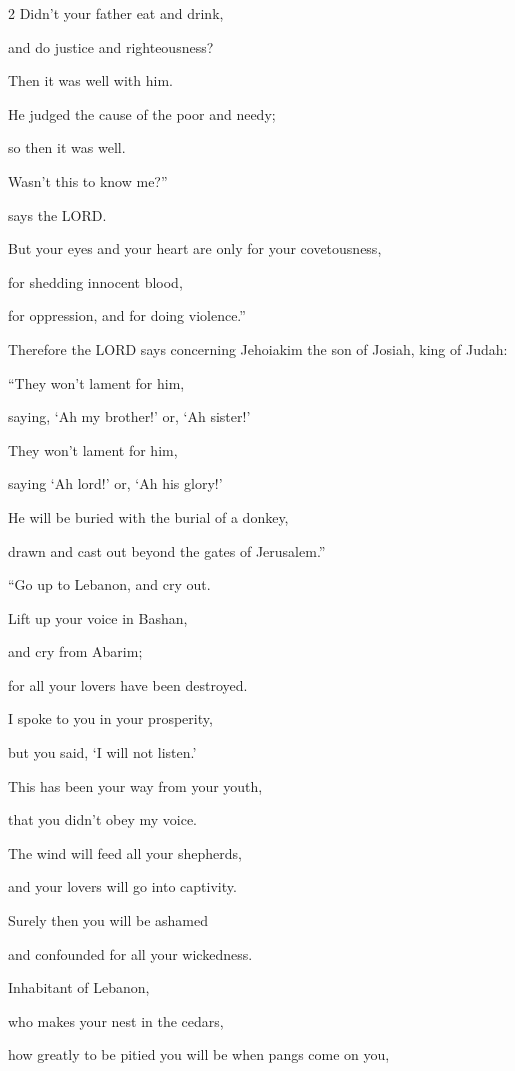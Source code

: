 \begin{multicols}{2}
Didn’t your father eat and drink,

and do justice and righteousness?

Then it was well with him.


\myverse{}He judged the cause of the poor and needy;

so then it was well.

Wasn’t this to know me?”

says the LORD.


\myverse{}But your eyes and your heart are only for your covetousness,

for shedding innocent blood,

for oppression, and for doing violence.”


\myverse{}Therefore the LORD says concerning Jehoiakim the son of Josiah, king of Judah:

“They won’t lament for him,

saying, ‘Ah my brother!’ or, ‘Ah sister!’

They won’t lament for him,

saying ‘Ah lord!’ or, ‘Ah his glory!’


\myverse{}He will be buried with the burial of a donkey,

drawn and cast out beyond the gates of Jerusalem.”

\vspace{\baselineskip}

\myverse{}“Go up to Lebanon, and cry out.

Lift up your voice in Bashan,

and cry from Abarim;

for all your lovers have been destroyed.


\myverse{}I spoke to you in your prosperity,

but you said, ‘I will not listen.’

This has been your way from your youth,

that you didn’t obey my voice.


\myverse{}The wind will feed all your shepherds,

and your lovers will go into captivity.

Surely then you will be ashamed

and confounded for all your wickedness.


\myverse{}Inhabitant of Lebanon,

who makes your nest in the cedars,

how greatly to be pitied you will be when pangs come on you,


\end{multicols}
